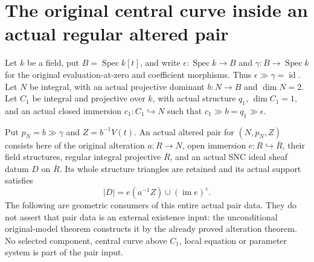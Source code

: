 \section{The original central curve inside an actual regular altered pair}

Let $k$ be a field, put $B=\operatorname{Spec}k[t]$, and write
$\epsilon:\operatorname{Spec}k\to B$ and $\gamma:B\to\operatorname{Spec}k$
for the original evaluation-at-zero and coefficient morphisms. Thus
$\epsilon\gg\gamma=\operatorname{id}$. Let $N$ be integral, with
an actual projective dominant $b:N\to B$ and $\dim N=2$. Let
$C_1$ be integral and projective over $k$, with actual structure $q_1$,
$\dim C_1=1$, and an actual closed immersion $c_1:C_1\hookrightarrow N$
such that $c_1\gg b=q_1\gg\epsilon$.

Put $p_N=b\gg\gamma$ and $Z=b^{-1}V(t)$. An actual altered pair for
$(N,p_N,Z)$ consists here of the original alteration $a:R\to N$,
open immersion $e:R\hookrightarrow\overline R$, their field structures,
regular integral projective $\overline R$, and an actual SNC ideal
sheaf datum $D$ on $\overline R$. Its whole structure triangles are
retained and its actual support satisfies
\[
 |D|=e(a^{-1}Z)\cup(\operatorname{im}e)^c.
\]
The following are geometric consumers of this entire actual pair data.
They do not assert that pair data is an external existence input: the
unconditional original-model theorem constructs it by the already proved
alteration theorem. No selected component, central curve above $C_1$,
local equation or parameter system is part of the pair input.

